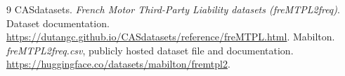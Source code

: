\documentclass[11pt,a4paper]{article}
\begin{document}
\begin{thebibliography}{9}
CASdatasets. \emph{French Motor Third-Party Liability datasets (freMTPL2freq)}. Dataset documentation. \url{https://dutangc.github.io/CASdatasets/reference/freMTPL.html}.
Mabilton. \emph{freMTPL2freq.csv}, publicly hosted dataset file and documentation. \url{https://huggingface.co/datasets/mabilton/fremtpl2}.
\end{thebibliography}
\end{document}
